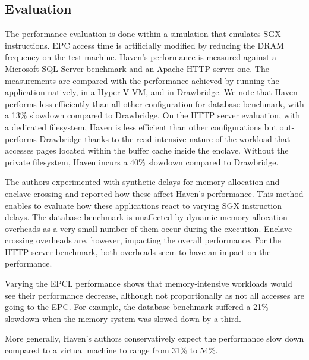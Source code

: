 \subsection{Evaluation}
%
The performance evaluation is done within a simulation that emulates SGX instructions.
EPC access time is artificially modified by reducing the DRAM frequency on the test machine.
Haven's performance is measured against a Microsoft SQL Server benchmark and an Apache HTTP server one.
The measurements are compared with the performance achieved by running the application natively, in a Hyper-V VM, and in Drawbridge.
We note that Haven performs less efficiently than all other configuration for database benchmark, with a 13\% slowdown compared to Drawbridge.
On the HTTP server evaluation, with a dedicated filesystem, Haven is less efficient than other configurations but out-performs Drawbridge thanks to the read intensive nature of the workload that accesses pages located within the buffer cache inside the enclave.
Without the private filesystem, Haven incurs a 40\% slowdown compared to Drawbridge.

The authors experimented with synthetic delays for memory allocation and enclave crossing and reported how these affect Haven's performance.
This method enables to evaluate how these applications react to varying SGX instruction delays.
The database benchmark is unaffected by dynamic memory allocation overheads as a very small number of them occur during the execution.
Enclave crossing overheads are, however, impacting the overall performance.
For the HTTP server benchmark, both overheads seem to have an impact on the performance.

Varying the EPCL performance shows that memory-intensive workloads would see their performance decrease, although not proportionally as not all accesses are going to the EPC.
For example, the database benchmark suffered a 21\% slowdown when the memory system was slowed down by a third.

More generally, Haven's authors conservatively expect the performance slow down compared to a virtual machine to range from 31\% to 54\%.
